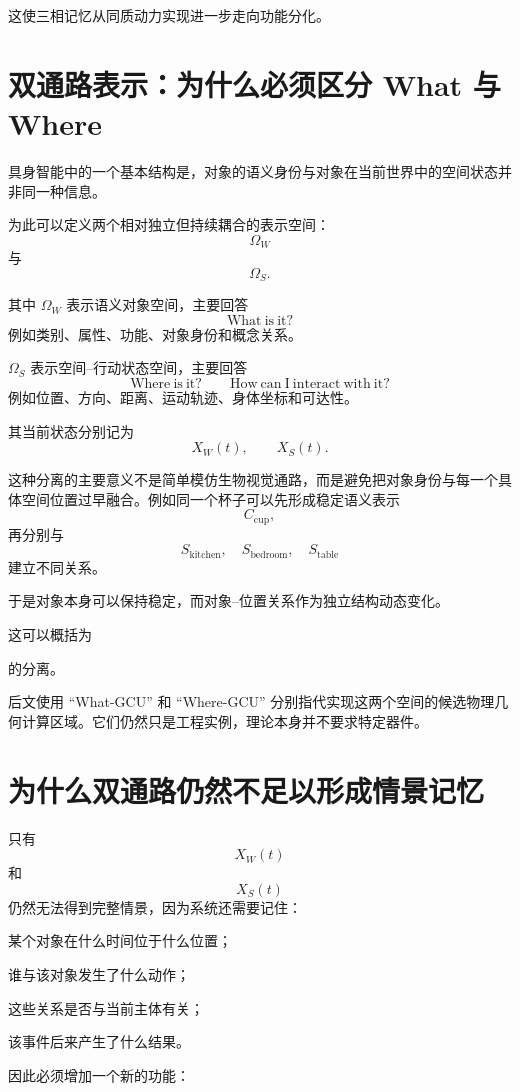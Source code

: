 这使三相记忆从同质动力实现进一步走向功能分化。

\section{双通路表示：为什么必须区分 What 与 Where}

具身智能中的一个基本结构是，对象的语义身份与对象在当前世界中的空间状态并非同一种信息。

为此可以定义两个相对独立但持续耦合的表示空间：
\[
\Omega_W
\]
与
\[
\Omega_S.
\]

其中 $\Omega_W$ 表示语义对象空间，主要回答
\[
\mathrm{What\ is\ it?}
\]
例如类别、属性、功能、对象身份和概念关系。

$\Omega_S$ 表示空间--行动状态空间，主要回答
\[
\mathrm{Where\ is\ it?}
\qquad
\mathrm{How\ can\ I\ interact\ with\ it?}
\]
例如位置、方向、距离、运动轨迹、身体坐标和可达性。

其当前状态分别记为
\[
X_W(t),
\qquad
X_S(t).
\]

这种分离的主要意义不是简单模仿生物视觉通路，而是避免把对象身份与每一个具体空间位置过早融合。例如同一个杯子可以先形成稳定语义表示
\[
C_{\mathrm{cup}},
\]
再分别与
\[
S_{\mathrm{kitchen}},
\quad
S_{\mathrm{bedroom}},
\quad
S_{\mathrm{table}}
\]
建立不同关系。

于是对象本身可以保持稳定，而对象--位置关系作为独立结构动态变化。

这可以概括为
\begin{statementbox}
\centering
{}
\end{statementbox}
的分离。

后文使用 ``What-GCU'' 和 ``Where-GCU'' 分别指代实现这两个空间的候选物理几何计算区域。它们仍然只是工程实例，理论本身并不要求特定器件。

\section{为什么双通路仍然不足以形成情景记忆}

只有
\[
X_W(t)
\]
和
\[
X_S(t)
\]
仍然无法得到完整情景，因为系统还需要记住：

某个对象在什么时间位于什么位置；

谁与该对象发生了什么动作；

这些关系是否与当前主体有关；

该事件后来产生了什么结果。

因此必须增加一个新的功能：
\begin{statementbox}
\centering
{}
\end{statementbox}

